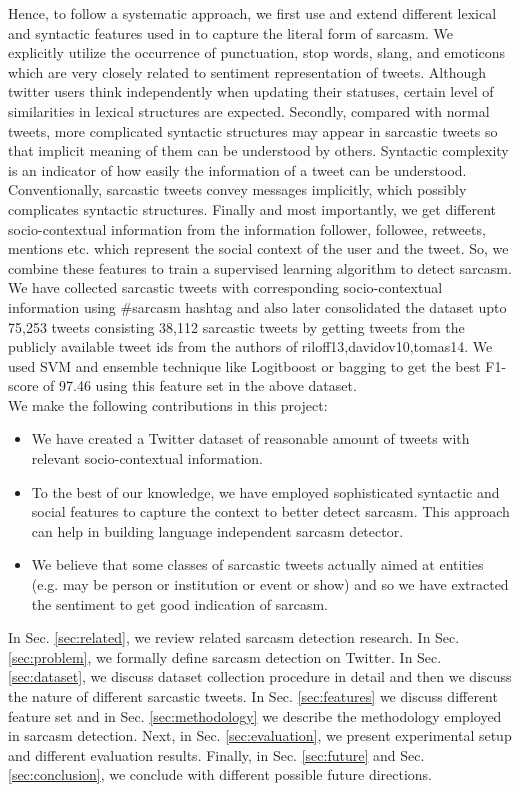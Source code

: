 Hence, to follow a systematic approach, we first use and extend different lexical and syntactic features used in \cite{riloff13,davidov10,tomas14,gonzalez_acl} to capture the literal form of sarcasm. We explicitly utilize the occurrence of punctuation, stop words, slang, and emoticons which are very closely related to sentiment representation of tweets. Although twitter users think independently when updating their statuses, certain level of similarities in lexical structures are expected. Secondly, compared with normal tweets, more complicated syntactic structures may appear in sarcastic tweets so that implicit meaning of them can be understood by others. Syntactic complexity is an indicator of how easily the information of a tweet can be understood. Conventionally, sarcastic tweets convey messages implicitly, which possibly complicates syntactic structures. Finally and most importantly, we get different socio-contextual information from the information follower, followee, retweets, mentions etc. which represent the social context of the user and the tweet. So, we combine these features to train a supervised learning algorithm to detect sarcasm. We have collected sarcastic tweets with corresponding socio-contextual information using \#sarcasm hashtag and also later consolidated the dataset upto 75,253 tweets consisting 38,112 sarcastic tweets by getting tweets from the publicly available tweet ids from the authors of {riloff13,davidov10,tomas14}. We used SVM and ensemble technique like Logitboost or bagging to get the best F1-score of 97.46 using this feature set in the above dataset.\\ 

\noindent We make the following contributions in this project:
\begin{itemize}
 \item We have created a Twitter dataset of reasonable amount of tweets with relevant socio-contextual information.
 \item To the best of our knowledge, we have employed sophisticated syntactic and social features to capture the context to better detect sarcasm. This approach can help in building language independent sarcasm detector.
 \item We believe that some classes of sarcastic tweets actually aimed at entities (e.g. may be person or institution or event or show) and so we have extracted the sentiment to get good indication of sarcasm.\\
\end{itemize}

In Sec. \ref{sec:related}, we review related sarcasm detection research. In Sec. \ref{sec:problem}, we formally define sarcasm detection on Twitter. In Sec. \ref{sec:dataset}, we discuss dataset collection procedure in detail and then we discuss the nature of different sarcastic tweets. In Sec. \ref{sec:features} we discuss different feature set and in Sec. \ref{sec:methodology} we describe the methodology employed in sarcasm detection. Next, in Sec. \ref{sec:evaluation}, we present experimental setup and different evaluation results. Finally, in Sec. \ref{sec:future} and Sec. \ref{sec:conclusion}, we conclude with different possible future directions.



